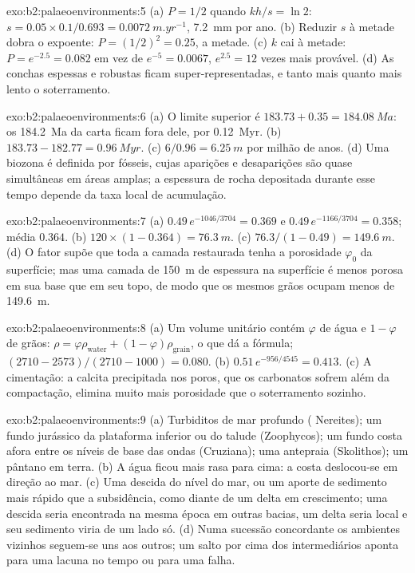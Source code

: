 \begin{solution}{exo:b2:palaeoenvironments:5}
(a) $P = 1/2$ quando $kh/s = \ln 2$: $s = 0.05 \times 0.1/0.693 = \qty{0.0072}{m.yr^{-1}}$,
\qty{7.2}{mm} por ano. (b) Reduzir $s$ à metade dobra o expoente: $P = (1/2)^2 = 0.25$, a metade.
(c) $k$ cai à metade: $P = e^{-2.5} = 0.082$ em vez de $e^{-5} = 0.0067$, $e^{2.5} = 12$ vezes mais
provável. (d) As conchas espessas e robustas ficam super-representadas, e tanto mais quanto mais lento o soterramento.
\end{solution}

\begin{solution}{exo:b2:palaeoenvironments:6}
(a) O limite superior é $183.73 + 0.35 = \qty{184.08}{Ma}$: os \qty{184.2}{Ma} da carta ficam
fora dele, por \qty{0.12}{Myr}. (b) $183.73 - 182.77 = \qty{0.96}{Myr}$. (c) $6/0.96 =
\qty{6.25}{m}$ por milhão de anos. (d) Uma biozona é definida por fósseis, cujas aparições e
desaparições são quase simultâneas em áreas amplas; a espessura de rocha depositada durante
esse tempo depende da taxa local de acumulação.
\end{solution}

\begin{solution}{exo:b2:palaeoenvironments:7}
(a) $0.49\,e^{-1046/3704} = 0.369$ e $0.49\,e^{-1166/3704} = 0.358$; média $0.364$. (b) $120
\times (1 - 0.364) = \qty{76.3}{m}$. (c) $76.3/(1 - 0.49) = \qty{149.6}{m}$. (d) O fator
supõe que toda a camada restaurada tenha a porosidade $\varphi_0$ da superfície; mas uma camada
de \qty{150}{m} de espessura na superfície é menos porosa em sua base que em seu topo, de modo que os mesmos grãos
ocupam menos de \qty{149.6}{m}.
\end{solution}

\begin{solution}{exo:b2:palaeoenvironments:8}
(a) Um volume unitário contém $\varphi$ de água e $1 - \varphi$ de grãos: $\rho = \varphi
\rho_{\text{water}} + (1 - \varphi)\rho_{\text{grain}}$, o que dá a fórmula; $(2710 -
2573)/(2710 - 1000) = 0.080$. (b) $0.51\,e^{-956/4545} = 0.413$. (c) A cimentação: a calcita
precipitada nos poros, que os carbonatos sofrem além da compactação, elimina muito mais porosidade
que o soterramento sozinho.
\end{solution}

\begin{solution}{exo:b2:palaeoenvironments:9}
(a) Turbiditos de mar profundo ( Nereites); um fundo jurássico da plataforma inferior ou do talude
(Zoophycos); um fundo costa afora entre os níveis de base das ondas (Cruziana); uma antepraia (Skolithos); um
pântano em terra. (b) A água ficou mais rasa para cima: a costa deslocou-se em direção ao mar. (c) Uma descida do nível do mar,
ou um aporte de sedimento mais rápido que a subsidência, como diante de um delta em crescimento; uma descida
seria encontrada na mesma época em outras bacias, um delta seria local e seu sedimento viria
de um lado só. (d) Numa sucessão concordante os ambientes vizinhos seguem-se uns aos outros; um
salto por cima dos intermediários aponta para uma lacuna no tempo ou para uma falha.
\end{solution}

